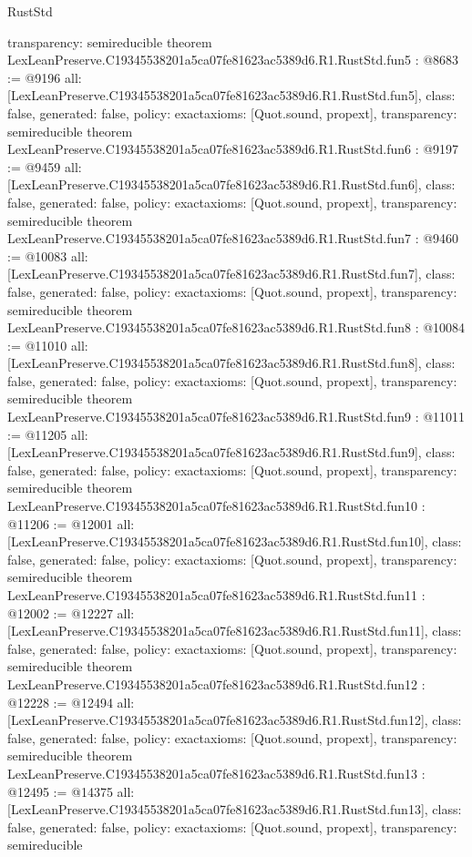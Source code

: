 \begin{lexlean}{RustStd}
\begin{coremodule}
{  transparency: semireducible
}
theorem LexLeanPreserve.C19345538201a5ca07fe81623ac5389d6.R1.RustStd.fun5 : @8683 := @9196 {
  all: [LexLeanPreserve.C19345538201a5ca07fe81623ac5389d6.R1.RustStd.fun5],
  class: false,
  generated: false,
  policy: exact{axioms: [Quot.sound, propext]},
  transparency: semireducible
}
theorem LexLeanPreserve.C19345538201a5ca07fe81623ac5389d6.R1.RustStd.fun6 : @9197 := @9459 {
  all: [LexLeanPreserve.C19345538201a5ca07fe81623ac5389d6.R1.RustStd.fun6],
  class: false,
  generated: false,
  policy: exact{axioms: [Quot.sound, propext]},
  transparency: semireducible
}
theorem LexLeanPreserve.C19345538201a5ca07fe81623ac5389d6.R1.RustStd.fun7 : @9460 := @10083 {
  all: [LexLeanPreserve.C19345538201a5ca07fe81623ac5389d6.R1.RustStd.fun7],
  class: false,
  generated: false,
  policy: exact{axioms: [Quot.sound, propext]},
  transparency: semireducible
}
theorem LexLeanPreserve.C19345538201a5ca07fe81623ac5389d6.R1.RustStd.fun8 : @10084 := @11010 {
  all: [LexLeanPreserve.C19345538201a5ca07fe81623ac5389d6.R1.RustStd.fun8],
  class: false,
  generated: false,
  policy: exact{axioms: [Quot.sound, propext]},
  transparency: semireducible
}
theorem LexLeanPreserve.C19345538201a5ca07fe81623ac5389d6.R1.RustStd.fun9 : @11011 := @11205 {
  all: [LexLeanPreserve.C19345538201a5ca07fe81623ac5389d6.R1.RustStd.fun9],
  class: false,
  generated: false,
  policy: exact{axioms: [Quot.sound, propext]},
  transparency: semireducible
}
theorem LexLeanPreserve.C19345538201a5ca07fe81623ac5389d6.R1.RustStd.fun10 : @11206 := @12001 {
  all: [LexLeanPreserve.C19345538201a5ca07fe81623ac5389d6.R1.RustStd.fun10],
  class: false,
  generated: false,
  policy: exact{axioms: [Quot.sound, propext]},
  transparency: semireducible
}
theorem LexLeanPreserve.C19345538201a5ca07fe81623ac5389d6.R1.RustStd.fun11 : @12002 := @12227 {
  all: [LexLeanPreserve.C19345538201a5ca07fe81623ac5389d6.R1.RustStd.fun11],
  class: false,
  generated: false,
  policy: exact{axioms: [Quot.sound, propext]},
  transparency: semireducible
}
theorem LexLeanPreserve.C19345538201a5ca07fe81623ac5389d6.R1.RustStd.fun12 : @12228 := @12494 {
  all: [LexLeanPreserve.C19345538201a5ca07fe81623ac5389d6.R1.RustStd.fun12],
  class: false,
  generated: false,
  policy: exact{axioms: [Quot.sound, propext]},
  transparency: semireducible
}
theorem LexLeanPreserve.C19345538201a5ca07fe81623ac5389d6.R1.RustStd.fun13 : @12495 := @14375 {
  all: [LexLeanPreserve.C19345538201a5ca07fe81623ac5389d6.R1.RustStd.fun13],
  class: false,
  generated: false,
  policy: exact{axioms: [Quot.sound, propext]},
  transparency: semireducible
}
\end{coremodule}
\end{lexlean}
